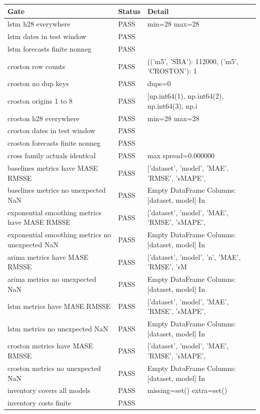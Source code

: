 {\scriptsize
\setlength\tabcolsep{4pt}
\begin{tabular}{lll}
\toprule Gate & Status & Detail \\
\midrule
lstm h28 everywhere & PASS & min=28 max=28 \\
lstm dates in test window & PASS &  \\
lstm forecasts finite nonneg & PASS &  \\
croston row counts & PASS & (('m5', 'SBA'): 112000, ('m5', 'CROSTON'): 1 \\
croston no dup keys & PASS & dups=0 \\
croston origins 1 to 8 & PASS & [np.int64(1), np.int64(2), np.int64(3), np.i \\
croston h28 everywhere & PASS & min=28 max=28 \\
croston dates in test window & PASS &  \\
croston forecasts finite nonneg & PASS &  \\
cross family actuals identical & PASS & max spread=0.000000 \\
baselines metrics have MASE RMSSE & PASS & ['dataset', 'model', 'MAE', 'RMSE', 'sMAPE', \\
baselines metrics no unexpected NaN & PASS & Empty DataFrame Columns: [dataset, model] In \\
exponential smoothing metrics have MASE RMSSE & PASS & ['dataset', 'model', 'MAE', 'RMSE', 'sMAPE', \\
exponential smoothing metrics no unexpected NaN & PASS & Empty DataFrame Columns: [dataset, model] In \\
arima metrics have MASE RMSSE & PASS & ['dataset', 'model', 'n', 'MAE', 'RMSE', 'sM \\
arima metrics no unexpected NaN & PASS & Empty DataFrame Columns: [dataset, model] In \\
lstm metrics have MASE RMSSE & PASS & ['dataset', 'model', 'MAE', 'RMSE', 'sMAPE', \\
lstm metrics no unexpected NaN & PASS & Empty DataFrame Columns: [dataset, model] In \\
croston metrics have MASE RMSSE & PASS & ['dataset', 'model', 'MAE', 'RMSE', 'sMAPE', \\
croston metrics no unexpected NaN & PASS & Empty DataFrame Columns: [dataset, model] In \\
inventory covers all models & PASS & missing=set() extra=set() \\
inventory costs finite & PASS &  \\
\bottomrule
\end{tabular}}

